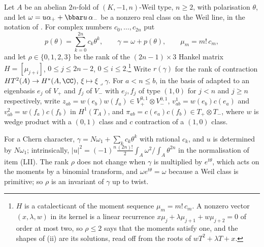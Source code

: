\begin{setupenv}\label{setup:p2prime}
Let $A$ be an abelian $2n$-fold of $(K,-1,n)$-Weil type, $n\ge2$, with
polarisation $\theta$, and let $\omega=u\alpha_{+}+\bbar u\,\alpha_{-}$ be a
nonzero real class on the Weil line, in the notation of .
For complex numbers $c_{0},\dots,c_{2n}$ put
\[
  p(\theta)=\sum_{k=0}^{2n}c_{k}\theta^{k},\qquad
  \gamma=\omega+p(\theta),\qquad \mu_{m}=m!\,c_{m},
\]
and let $\rho\in\{0,1,2,3\}$ be the rank of the $(2n-1)\times3$ Hankel matrix
$H=[\mu_{j+i}]$, $0\le j\le2n-2$, $0\le i\le2$.\footnote{$H$ is a
catalecticant of the moment sequence $\mu_{m}=m!\,c_{m}$. A nonzero vector
$(x,\lambda,w)$ in its kernel is a linear recurrence
$x\mu_{j}+\lambda\mu_{j+1}+w\mu_{j+2}=0$ of order at most two, so $\rho\le2$
says that the moments satisfy one, and the shapes of
(ii) are its solutions, read off from the roots of
$wT^{2}+\lambda T+x$.} Write $r(\gamma)$ for the
rank of contraction $HT^{2}(A)\to H^{*}(A,\CC)$, $\xi\mapsto\xi\lrcorner\gamma$.
For $a<n\le b$, in the basis of  adapted to an
eigenbasis $e_{j}$ of $V_{+}$ and $f_{j}$ of $V_{-}$ with $e_{j},f_{j}$ of
type $(1,0)$ for $j<n$ and $j\ge n$ respectively, write
$z_{ab}=w(e_{b})w(f_{a})\in V_{+}^{0,1}\otimes V_{-}^{0,1}$,
$v^{1}_{ab}=w(e_{b})c(e_{a})$ and $v^{2}_{ab}=w(f_{a})c(f_{b})$ in
$H^{1}(T_{A})$, and $\pi_{ab}=c(e_{a})c(f_{b})\in T_{+}\otimes T_{-}$, where
$w$ is wedge product with a $(0,1)$ class and $c$ contraction of a $(1,0)$
class.
\end{setupenv}

For a Chern character, $\gamma=N\omega_{1}+\sum_{k}c_{k}\theta^{k}$ with
rational $c_{k}$, and $u$ is determined by $N\omega_{1}$; intrinsically,
$|u|^{2}=(-1)^{n}\tfrac{(2n)!}{2}\int_{A}\omega^{2}\big/\!\int_{A}\theta^{2n}$
in the normalisation of item (LII). The rank $\rho$ does not change when
$\gamma$ is multiplied by $e^{t\theta}$, which acts on the moments by a
binomial transform, and $\omega e^{t\theta}=\omega$ because a Weil class is
primitive; so $\rho$ is an invariant of $\gamma$ up to twist.

